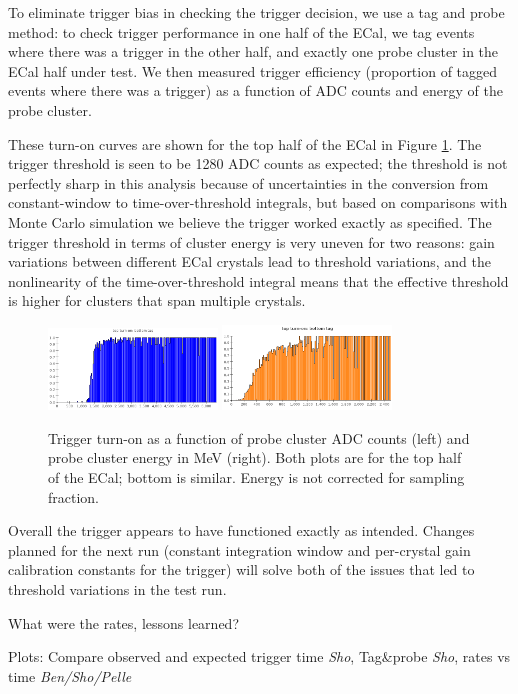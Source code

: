 To eliminate trigger bias in checking the trigger decision, we use a tag and probe method: to check trigger performance in one half of the ECal, we tag events where there was a trigger in the other half, and exactly one probe cluster in the ECal half under test. 
We then measured trigger efficiency (proportion of tagged events where there was a trigger) as a function of ADC counts and energy of the probe cluster.

These turn-on curves are shown for the top half of the ECal in Figure \ref{fig:turnon}. 
The trigger threshold is seen to be 1280 ADC counts as expected; the threshold is not perfectly sharp in this analysis because of uncertainties in the conversion from constant-window to time-over-threshold integrals, but based on comparisons with Monte Carlo simulation we believe the trigger worked exactly as specified. 
The trigger threshold in terms of cluster energy is very uneven for two reasons: gain variations between different ECal crystals lead to threshold variations, and the nonlinearity of the time-over-threshold integral means that the effective threshold is higher for clusters that span multiple crystals.

\begin{figure}[ht]
	\includegraphics[width=0.4\textwidth]{test2012/ecalperformance/top_turnon_adc}
	\includegraphics[width=0.4\textwidth]{test2012/ecalperformance/top_turnon_e}
	\caption{\small{Trigger turn-on as a function of probe cluster ADC counts (left) and probe cluster energy in MeV (right). Both plots are for the top half of the ECal; bottom is similar. 
	Energy is not corrected for sampling fraction.}}
	\label{fig:turnon}
\end{figure}

Overall the trigger appears to have functioned exactly as intended. Changes planned for the next run (constant integration window and per-crystal gain calibration constants for the trigger) will solve both of the issues that led to threshold variations in the test run.

What were the rates, lessons learned?

Plots: Compare observed and expected trigger time {\it Sho}, Tag\&probe {\it Sho}, rates vs time {\it Ben/Sho/Pelle}


